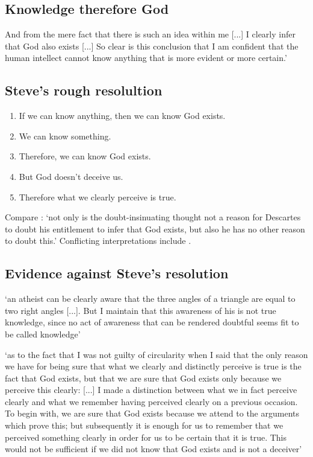 \documentclass[12pt]{extarticle}
\begin{document}
\begin{multicols*}{3}
\subsection{Knowledge therefore God}
And from the mere fact that there is such an
idea within me [...] I clearly infer that God
also exists [...] 
So clear is this conclusion that I am confident that the human intellect
cannot know anything that is more evident or more certain.’
 
\subsection{Steve’s rough resolultion}
\begin{enumerate}
\item If we can know anything, then we can know God exists.
\item We can know something.
\item Therefore, we can know God exists.
\item But God doesn’t deceive us.
\item Therefore what we clearly perceive is true.
\end{enumerate}
Compare \citet{murdoch:1999_cartesian}: ‘not only is the doubt-insinuating thought not a reason 
for Descartes to doubt his entitlement to infer that God exists, but also he has no other 
reason to doubt this.’ Conflicting interpretations include \citet{rocca:2005_descartes,broughton:2003_descartes,doney:1955_cartesian}.

\subsection{Evidence against Steve’s resolution}
‘an atheist can be clearly aware that the three angles of a triangle are equal to two 
right angles [...]. But I maintain that this awareness of his is not 
true knowledge, since no act of awareness that can be rendered doubtful seems 
fit to be called knowledge’
\citep[p.~101, AT VII: 141]{descartes:1985_csm2}
 
‘as to the fact that I was not guilty of circularity when I said that the only
reason we have for being sure that what we clearly and distinctly perceive is
true is the fact that God exists, but that we are sure that God exists only
because we perceive this clearly: [...] I made a distinction between what we in fact perceive
clearly and what we remember having perceived clearly on a previous occasion.
To begin with, we are sure that God exists because we attend to the arguments
which prove this; but subsequently it is enough for us to remember that we
perceived something clearly in order for us to be certain that it is true. This
would not be sufficient if we did not know that God exists and is not a
deceiver’
\citep[p.~171, AT VII:245--6]{descartes:1985_csm2}
 

\end{multicols*}
\end{document}
